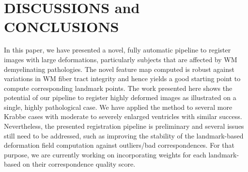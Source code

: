 \documentclass{llncs}
\begin{document}
\section{DISCUSSIONS and CONCLUSIONS}
In this paper, we have presented a novel, fully automatic pipeline to register images with large deformations, particularly subjects that are affected by WM demyelinating pathologies. The novel feature map computed is robust against variations in WM fiber tract integrity and hence yields a good starting point to compute corresponding landmark points. The work presented here shows the potential of our pipeline to register highly deformed images as illustrated on a single, highly pathological case. We have applied the method to several more Krabbe cases with moderate to severely enlarged ventricles with similar success. Nevertheless, the presented registration pipeline is preliminary and several issues still need to be addressed, such as improving the stability of the landmark-based deformation field computation against outliers/bad correspondences. For that purpose, we are currently working on incorporating weights for each landmark-based on their correspondence quality score.

%
%


\end{document}
